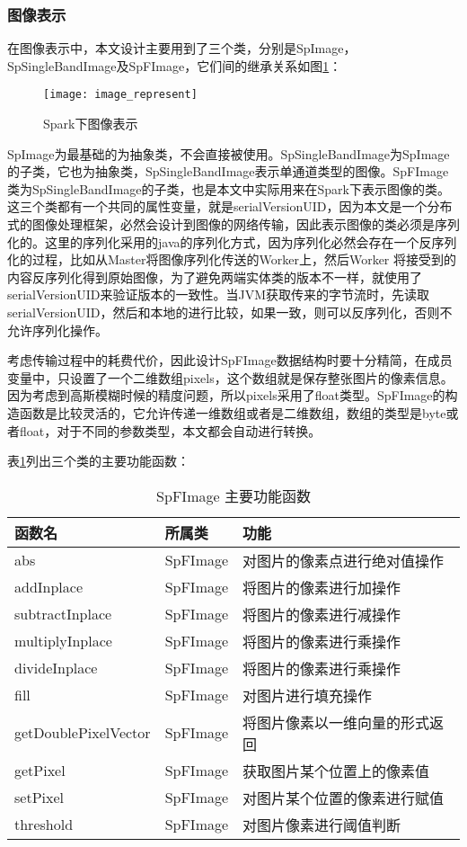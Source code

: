 \subsubsection{图像表示}
在图像表示中，本文设计主要用到了三个类，分别是SpImage，SpSingleBandImage及SpFImage，它们间的继承关系如图\ref{fig:image_represent}：
\begin{figure}[htp]
\centering
\texttt{[image: image\_represent]}
\caption{Spark下图像表示}
\label{fig:image_represent}
\end{figure}
SpImage为最基础的为抽象类，不会直接被使用。SpSingleBandImage为SpImage的子类，它也为抽象类，SpSingleBandImage表示单通道类型的图像。SpFImage类为SpSingleBandImage的子类，也是本文中实际用来在Spark下表示图像的类。这三个类都有一个共同的属性变量，就是serialVersionUID，因为本文是一个分布式的图像处理框架，必然会设计到图像的网络传输，因此表示图像的类必须是序列化的。这里的序列化采用的java的序列化方式，因为序列化必然会存在一个反序列化的过程，比如从Master将图像序列化传送的Worker上，然后Worker 将接受到的内容反序列化得到原始图像，为了避免两端实体类的版本不一样，就使用了serialVersionUID来验证版本的一致性。当JVM获取传来的字节流时，先读取serialVersionUID，然后和本地的进行比较，如果一致，则可以反序列化，否则不允许序列化操作。

考虑传输过程中的耗费代价，因此设计SpFImage数据结构时要十分精简，在成员变量中，只设置了一个二维数组pixels，这个数组就是保存整张图片的像素信息。因为考虑到高斯模糊时候的精度问题，所以pixels采用了float类型。SpFImage的构造函数是比较灵活的，它允许传递一维数组或者是二维数组，数组的类型是byte或者float，对于不同的参数类型，本文都会自动进行转换。

表\ref{tab:SpFImage_function}列出三个类的主要功能函数：
\begin{table}[h] %
\caption{SpFImage 主要功能函数} %
\centering
\label{tab:SpFImage_function}
\begin{tabular}{p{4cm}|p{2cm}|p{6cm}} %
\hline
\hline
函数名  & 所属类 & 功能 \\ %
\hline %
abs  & SpFImage & 对图片的像素点进行绝对值操作\\
\hline
addInplace  & SpFImage & 将图片的像素进行加操作\\
\hline
subtractInplace  & SpFImage & 将图片的像素进行减操作\\
\hline
multiplyInplace  & SpFImage & 将图片的像素进行乘操作\\
\hline
divideInplace  & SpFImage & 将图片的像素进行乘操作\\
\hline
fill  & SpFImage & 对图片进行填充操作\\
\hline
getDoublePixelVector & SpFImage & 将图片像素以一维向量的形式返回\\
\hline
getPixel& SpFImage & 获取图片某个位置上的像素值\\
\hline
setPixel & SpFImage & 对图片某个位置的像素进行赋值\\
\hline
threshold & SpFImage & 对图片像素进行阈值判断\\
\hline
\hline
\end{tabular}
\end{table}
